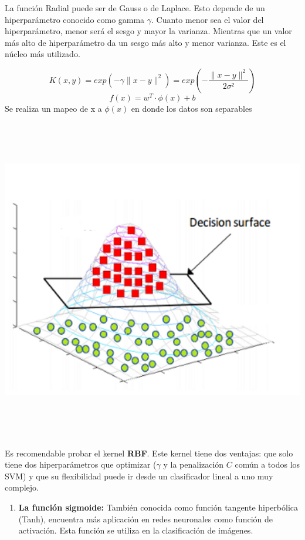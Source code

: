 \documentclass[
]{book}
\providecommand{\tightlist}{%
  \setlength{\itemsep}{0pt}\setlength{\parskip}{0pt}}
\begin{document}
La función Radial puede ser de Gauss o de Laplace. Esto depende de un hiperparámetro conocido como gamma \(\gamma\). Cuanto menor sea el valor del hiperparámetro, menor será el sesgo y mayor la varianza. Mientras que un valor más alto de hiperparámetro da un sesgo más alto y menor varianza. Este es el núcleo más utilizado.

\[K(x, y)=exp(-\gamma \parallel x - y\parallel^2)=exp(-\frac{\parallel x-y \parallel ^2}{2\sigma²})\]
\[f(x)=w^T \cdot \phi(x) + b\]
Se realiza un mapeo de x a \(\phi(x)\) en donde los datos son separables

\begin{center}\includegraphics[width=400pt,height=400pt]{img/03-svm/svm_radial} \end{center}

Es recomendable probar el kernel \textbf{RBF}. Este kernel tiene dos ventajas: que solo tiene dos hiperparámetros que optimizar (\(\gamma\) y la penalización \(C\) común a todos los SVM) y que su flexibilidad puede ir desde un clasificador lineal a uno muy complejo.

\begin{enumerate}
\def\labelenumi{\arabic{enumi}.}
\setcounter{enumi}{3}
\tightlist
\item
  \textbf{La función sigmoide:} También conocida como función tangente hiperbólica (Tanh), encuentra más aplicación en redes neuronales como función de activación. Esta función se utiliza en la clasificación de imágenes.
\end{enumerate}
\end{document}
